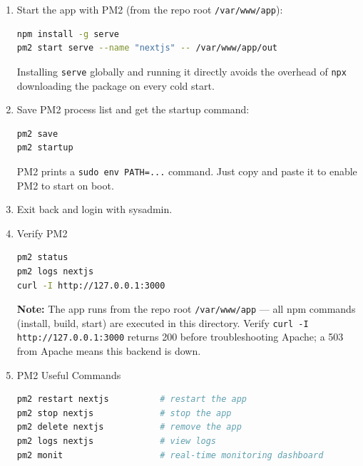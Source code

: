 \documentclass[12pt,a4paper]{report}
\begin{document}
\begin{enumerate}
\item Start the app with PM2 (from the repo root \texttt{/var/www/app}):
\begin{lstlisting}[language=bash]
npm install -g serve
pm2 start serve --name "nextjs" -- /var/www/app/out
\end{lstlisting}
\begin{markdownnote}
Installing \texttt{serve} globally and running it directly avoids the overhead of \texttt{npx} downloading the package on every cold start.
\end{markdownnote}
\item Save PM2 process list and get the startup command:
\begin{lstlisting}[language=bash]
pm2 save
pm2 startup
\end{lstlisting}
\begin{markdownnote}
PM2 prints a \texttt{sudo env PATH=...} command. Just copy and paste it to enable PM2 to start on boot.
\end{markdownnote}
\item Exit back and login with sysadmin.
\newpage

\item Verify PM2
\begin{lstlisting}[language=bash]
pm2 status
pm2 logs nextjs
curl -I http://127.0.0.1:3000
\end{lstlisting}
\begin{markdownnote}
\textbf{Note:} The app runs from the repo root \texttt{/var/www/app} — all npm commands (install, build, start) are executed in this directory. Verify \texttt{curl -I http://127.0.0.1:3000} returns 200 before troubleshooting Apache; a 503 from Apache means this backend is down.
\end{markdownnote}

\item PM2 Useful Commands
\begin{lstlisting}[language=bash]
pm2 restart nextjs          # restart the app
pm2 stop nextjs             # stop the app
pm2 delete nextjs           # remove the app
pm2 logs nextjs             # view logs
pm2 monit                   # real-time monitoring dashboard
\end{lstlisting}

\end{enumerate}
\end{document}
